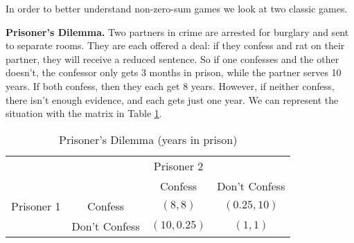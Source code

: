 




In order to better understand non-zero-sum games we look at two classic games. 


\begin{example}\label{E:PrisonersDilemma}\textbf{Prisoner's Dilemma.}
Two partners in crime are arrested for  burglary and sent to separate rooms. They are each offered a deal: if they confess and rat on their partner, they will receive a reduced sentence. So if one confesses and the other doesn't, the confessor only gets 3 months in prison, while the partner serves 10 years. If both confess, then they each get 8 years. However, if neither confess, there isn't enough evidence, and each gets just one year. We can represent the situation with the matrix in Table \ref{T:PrisonersDilemma}.



\begin{table}[h]
\centering

\begin{tabular}{cccc}
                      & \multicolumn{3}{c}{Prisoner 2}                                                  \\ \cline{2-4} 
\multicolumn{1}{l|}{} & \multicolumn{1}{l|}{} & \multicolumn{1}{c|}{Confess} & \multicolumn{1}{c|}{Don't Confess} \\ \cline{2-4} 
\multicolumn{1}{l|}{Prisoner 1} & \multicolumn{1}{c|}{Confess} & \multicolumn{1}{c|}{$(8, 8)$} & \multicolumn{1}{c|}{$(0.25, 10)$} \\ \cline{2-4} 
\multicolumn{1}{l|}{} & \multicolumn{1}{c|}{Don't Confess} & \multicolumn{1}{c|}{$(10, 0.25)$} & \multicolumn{1}{c|}{$(1, 1)$} \\ \cline{2-4} 
\end{tabular}
\caption{Prisoner's Dilemma (years in prison)}
\label{T:PrisonersDilemma}
\end{table}
\end{example}


